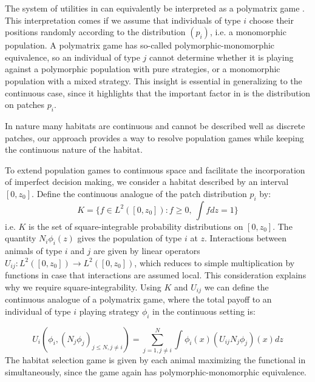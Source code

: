 

The system of utilities in  can equivalently be interpreted as a polymatrix game \citep{howson1972equilibria}. This interpretation comes if we assume that individuals of type $i$ choose their positions randomly according to the distribution $(p_i)$, i.e. a monomorphic population. A polymatrix game has so-called polymorphic-monomorphic equivalence, so an individual of type $j$ cannot determine whether it is playing against a polymorphic population with pure strategies, or a monomorphic population with a mixed strategy. This insight is essential in generalizing to the continuous case, since it highlights that the important factor in  is the distribution on patches $p_i$.

In nature many habitats are continuous and cannot be described well as discrete patches,  our approach provides a way to resolve population games while keeping the continuous nature of the habitat.

To extend population games to continuous space and facilitate the incorporation of imperfect decision making, we consider a habitat described by an interval $[0,z_0]$. Define the continuous analogue of the patch distribution $p_i$ by:
\begin{equation}
  K = \{ f \in L^2([0,z_0]) : f \geq 0,~\int f dz = 1\}
  \label{eq:space_of_dists}
\end{equation}
i.e. $K$ is the set of square-integrable probability distributions on $[0,z_0]$. The quantity $N_i \phi_i(z)$ gives the population of type $i$ at $z$. Interactions between animals of type $i$ and $j$ are given by linear operators $U_{ij}: L^2([0,z_0]) \to L^2([0,z_0])$, which reduces to simple multiplication by functions in case that interactions are assumed local. This consideration explains why we require square-integrability. Using $K$ and $U_{ij}$ we can define the continuous analogue of a polymatrix game, where the total payoff to an individual of type $i$ playing strategy $\phi_i$ in the continuous setting is:

\begin{equation}
  U_i(\phi_i, (N_j \phi_j)_{j \leq N, j \neq i}) = \sum_{j=1,j\neq i}^N \int \phi_i(x) (U_{ij}N_j \phi_j)(x) dz%
  \label{eq:utility}
\end{equation}
The habitat selection game is given by each animal maximizing the functional in  simultaneously, since the game again has polymorphic-monomorphic equivalence.

